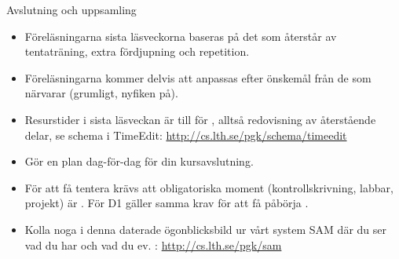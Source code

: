 \begin{SlideExtra}{Avslutning och uppsamling}

\begin{itemize}

\item Föreläsningarna sista läsveckorna baseras på det som återstår av tentaträning, extra fördjupning och repetition.

\item Föreläsningarna kommer delvis att anpassas efter önskemål från de som närvarar (grumligt, nyfiken på).

\item Resurstider i sista läsveckan är till för , alltså redovisning av återstående delar, se schema i TimeEdit: \url{http://cs.lth.se/pgk/schema/timeedit}

\item Gör en  plan dag-för-dag för din kursavslutning.

\item För att få tentera krävs att  obligatoriska moment (kontrollskrivning, labbar, projekt) är . För D1 gäller samma krav för att få påbörja .

\item Kolla noga i denna daterade ögonblicksbild ur vårt system SAM där du ser vad du har
  och vad du ev. : \url{http://cs.lth.se/pgk/sam}

\end{itemize}

\end{SlideExtra}


%
%

\fi